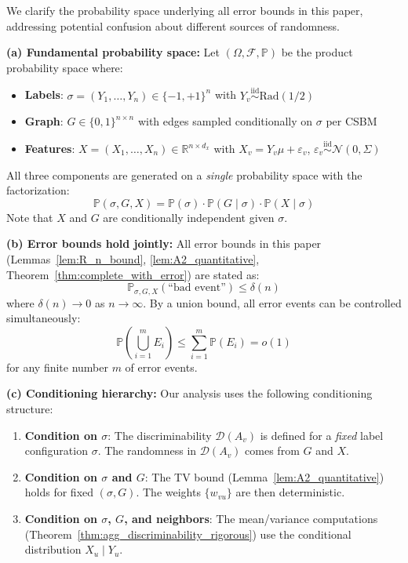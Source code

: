 \begin{remark}
\label{rem:unified_probability_space}
We clarify the probability space underlying all error bounds in this paper, addressing potential confusion about different sources of randomness.

\textbf{(a) Fundamental probability space:}
Let $(\Omega, \mathcal{F}, \mathbb{P})$ be the product probability space where:
\begin{itemize}
    \item \textbf{Labels}: $\sigma = (Y_1, \ldots, Y_n) \in \{-1, +1\}^n$ with $Y_v \stackrel{\text{iid}}{\sim} \mathrm{Rad}(1/2)$
    \item \textbf{Graph}: $G \in \{0,1\}^{n \times n}$ with edges sampled conditionally on $\sigma$ per CSBM
    \item \textbf{Features}: $X = (X_1, \ldots, X_n) \in \mathbb{R}^{n \times d_x}$ with $X_v = Y_v \mu + \varepsilon_v$, $\varepsilon_v \stackrel{\text{iid}}{\sim} \mathcal{N}(0, \Sigma)$
\end{itemize}
All three components are generated on a \textit{single} probability space with the factorization:
\begin{equation}
    \mathbb{P}(\sigma, G, X) = \mathbb{P}(\sigma) \cdot \mathbb{P}(G \mid \sigma) \cdot \mathbb{P}(X \mid \sigma)
\end{equation}
Note that $X$ and $G$ are conditionally independent given $\sigma$.

\textbf{(b) Error bounds hold jointly:}
All error bounds in this paper (Lemmas~\ref{lem:R_n_bound}, \ref{lem:A2_quantitative}, Theorem~\ref{thm:complete_with_error}) are stated as:
\begin{equation}
    \mathbb{P}_{\sigma, G, X}\left(\text{``bad event''}\right) \leq \delta(n)
\end{equation}
where $\delta(n) \to 0$ as $n \to \infty$. By a union bound, all error events can be controlled simultaneously:
\begin{equation}
    \mathbb{P}\left(\bigcup_{i=1}^{m} E_i\right) \leq \sum_{i=1}^{m} \mathbb{P}(E_i) = o(1)
\end{equation}
for any finite number $m$ of error events.

\textbf{(c) Conditioning hierarchy:}
Our analysis uses the following conditioning structure:
\begin{enumerate}
    \item \textbf{Condition on $\sigma$}: The discriminability $\mathcal{D}(A_v)$ is defined for a \textit{fixed} label configuration $\sigma$. The randomness in $\mathcal{D}(A_v)$ comes from $G$ and $X$.
    \item \textbf{Condition on $\sigma$ and $G$}: The TV bound (Lemma~\ref{lem:A2_quantitative}) holds for fixed $(\sigma, G)$. The weights $\{w_{vu}\}$ are then deterministic.
    \item \textbf{Condition on $\sigma$, $G$, and neighbors}: The mean/variance computations (Theorem~\ref{thm:agg_discriminability_rigorous}) use the conditional distribution $X_u \mid Y_u$.
\end{enumerate}


\end{remark}
